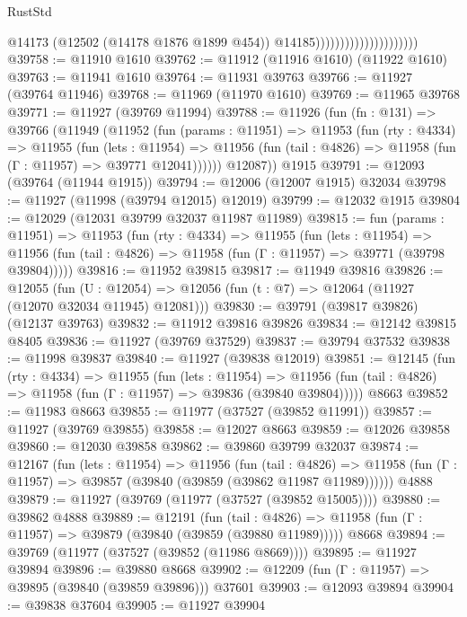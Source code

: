 \begin{lexlean}{RustStd}
\begin{coremodule}
                                              @14173
                                              (@12502 (@14178 @1876 @1899 @454))
                                              @14185)))))))))))))))))))))
@39758 := @11910 @1610
@39762 := @11912 (@11916 @1610) (@11922 @1610)
@39763 := @11941 @1610
@39764 := @11931 @39763
@39766 := @11927 (@39764 @11946)
@39768 := @11969 (@11970 @1610)
@39769 := @11965 @39768
@39771 := @11927 (@39769 @11994)
@39788 := @11926
    (fun (fn : @131) =>
    @39766
      (@11949
        (@11952
          (fun (params : @11951) =>
          @11953
            (fun (rty : @4334) =>
            @11955
              (fun (lets : @11954) =>
              @11956 (fun (tail : @4826) => @11958 (fun (Γ : @11957) => @39771 @12041))))))
        @12087))
    @1915
@39791 := @12093 (@39764 (@11944 @1915))
@39794 := @12006 (@12007 @1915) @32034
@39798 := @11927 (@11998 (@39794 @12015) @12019)
@39799 := @12032 @1915
@39804 := @12029 (@12031 @39799 @32037 @11987 @11989)
@39815 := fun (params : @11951) =>
  @11953
    (fun (rty : @4334) =>
    @11955
      (fun (lets : @11954) =>
      @11956 (fun (tail : @4826) => @11958 (fun (Γ : @11957) => @39771 (@39798 @39804)))))
@39816 := @11952 @39815
@39817 := @11949 @39816
@39826 := @12055
    (fun (U : @12054) => @12056 (fun (t : @7) => @12064 (@11927 (@12070 @32034 @11945) @12081)))
@39830 := @39791 (@39817 @39826) (@12137 @39763)
@39832 := @11912 @39816 @39826
@39834 := @12142 @39815 @8405
@39836 := @11927 (@39769 @37529)
@39837 := @39794 @37532
@39838 := @11998 @39837
@39840 := @11927 (@39838 @12019)
@39851 := @12145
    (fun (rty : @4334) =>
    @11955
      (fun (lets : @11954) =>
      @11956 (fun (tail : @4826) => @11958 (fun (Γ : @11957) => @39836 (@39840 @39804)))))
    @8663
@39852 := @11983 @8663
@39855 := @11977 (@37527 (@39852 @11991))
@39857 := @11927 (@39769 @39855)
@39858 := @12027 @8663
@39859 := @12026 @39858
@39860 := @12030 @39858
@39862 := @39860 @39799 @32037
@39874 := @12167
    (fun (lets : @11954) =>
    @11956
      (fun (tail : @4826) =>
      @11958 (fun (Γ : @11957) => @39857 (@39840 (@39859 (@39862 @11987 @11989))))))
    @4888
@39879 := @11927 (@39769 (@11977 (@37527 (@39852 @15005))))
@39880 := @39862 @4888
@39889 := @12191
    (fun (tail : @4826) => @11958 (fun (Γ : @11957) => @39879 (@39840 (@39859 (@39880 @11989)))))
    @8668
@39894 := @39769 (@11977 (@37527 (@39852 (@11986 @8669))))
@39895 := @11927 @39894
@39896 := @39880 @8668
@39902 := @12209 (fun (Γ : @11957) => @39895 (@39840 (@39859 @39896))) @37601
@39903 := @12093 @39894
@39904 := @39838 @37604
@39905 := @11927 @39904

\end{coremodule}
\end{lexlean}
